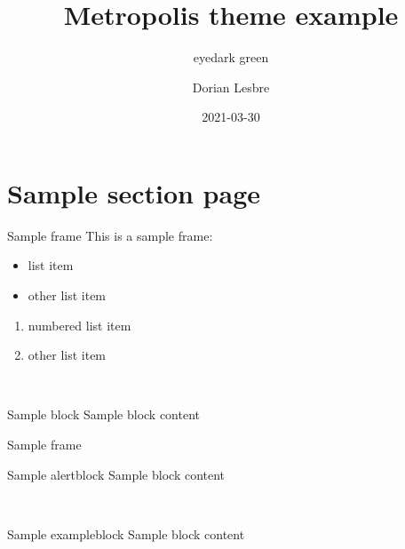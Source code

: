 \documentclass[14pt]{beamer}
\title{Metropolis theme example}
\subtitle{eyedark green}
\author{Dorian Lesbre}
\date{2021-03-30}
\begin{document}
\begin{frame}
	\titlepage
\end{frame}

\section{Sample section page}

\begin{frame}{Sample frame}
	This is a sample frame:
	\begin{multicols}{2}
		\begin{itemize}
			\item list item
			\item other list item
		\end{itemize}
		\begin{enumerate}
			\item numbered list item
			\item other list item
		\end{enumerate}
	\end{multicols}
	~\\
	\begin{block}{Sample block}
		Sample block content
	\end{block}
\end{frame}

\begin{frame}{Sample frame}

	\begin{alertblock}{Sample alertblock}
		Sample block content
	\end{alertblock}
	~\\
	\begin{exampleblock}{Sample exampleblock}
		Sample block content
	\end{exampleblock}
\end{frame}
\end{document}
